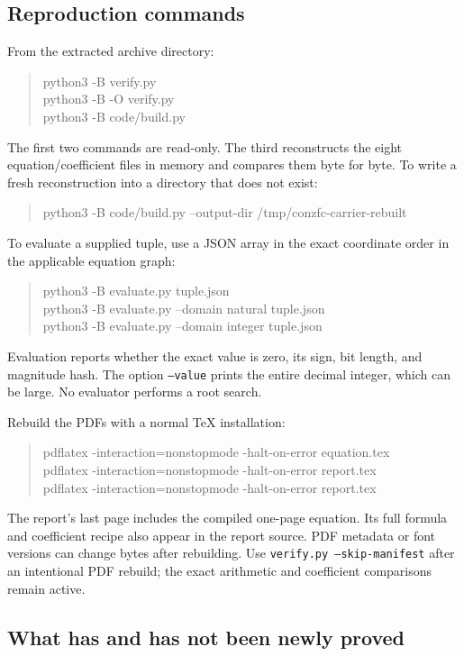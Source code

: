 \documentclass[11pt,letterpaper]{article}
\theoremstyle{definition}
\newcommand{\code}[1]{\texttt{\small #1}}
\begin{document}
\subsection{Reproduction commands}

From the extracted archive directory:
\begin{quote}\ttfamily\small
python3 -B verify.py\\
python3 -B -O verify.py\\
python3 -B code/build.py
\end{quote}
The first two commands are read-only. The third reconstructs the eight
equation/coefficient files in memory and compares them byte for byte.
To write a fresh reconstruction into a directory that does not exist:
\begin{quote}\ttfamily\small
python3 -B code/build.py --output-dir /tmp/conzfc-carrier-rebuilt
\end{quote}
To evaluate a supplied tuple, use a JSON array in the exact coordinate
order in the applicable equation graph:
\begin{quote}\ttfamily\small
python3 -B evaluate.py tuple.json\\
python3 -B evaluate.py --domain natural tuple.json\\
python3 -B evaluate.py --domain integer tuple.json
\end{quote}
Evaluation reports whether the exact value is zero, its sign, bit length,
and magnitude hash. The option \code{--value} prints the entire decimal
integer, which can be large. No evaluator performs a root search.

Rebuild the PDFs with a normal TeX installation:
\begin{quote}\ttfamily\small
pdflatex -interaction=nonstopmode -halt-on-error equation.tex\\
pdflatex -interaction=nonstopmode -halt-on-error report.tex\\
pdflatex -interaction=nonstopmode -halt-on-error report.tex
\end{quote}
The report's last page includes the compiled one-page equation. Its full
formula and coefficient recipe also appear in the report source.
PDF metadata or font versions can change bytes after rebuilding.
Use \code{verify.py --skip-manifest} after an intentional PDF rebuild;
the exact arithmetic and coefficient comparisons remain active.

\subsection{What has and has not been newly proved}
\end{document}

